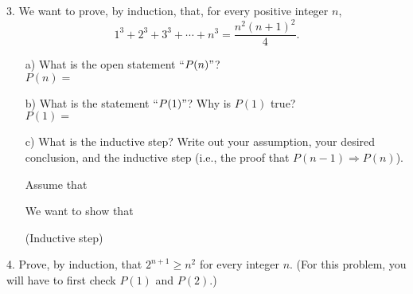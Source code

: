 \documentclass[12pt, reqno]{amsart}
\begin{document}
3. We want to prove, by induction, that, for every positive integer $n$, 
\[
1^3 + 2^3 + 3^3 + \cdots + n^3 = \frac{n^2(n+1)^2}{4}.
\]
\begin{itemize}
\item [a)] What is the open statement ``$P(n)"$?\\

$P(n) = $
\vspace{1cm}
\item [b)] What is the statement ``$P(1)"$? Why is $P(1)$ true?\\

$P(1) = $
\vspace{1cm}
\item [c)] What is the inductive step? Write out your assumption, your desired conclusion, and the inductive step (i.e., the proof that $P(n-1) \Rightarrow P(n)$).

 Assume that \\\vspace{0.5cm}

 We want to show that\\\vspace{0.5cm}

 (Inductive step)\\\vspace{0.5cm}

\end{itemize}

4. Prove, by induction, that $2^{n+1} \geq n^2$ for every integer $n$. (For this problem, you will have to first check $P(1)$ and $P(2)$.)
\end{document}
